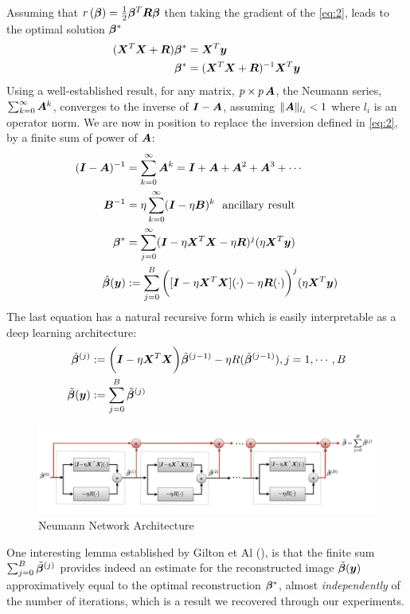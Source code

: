 \documentclass{article}
\begin{document}
Assuming that $r\left( \bm{\beta} \right) = \frac{1}{2} \bm{\beta}^T \bm{R} \bm{\beta}$ then taking the gradient of the \eqref{eq:2}, leads to the optimal solution $\bm{\beta}^{\ast}$
\begin{align*}
	(\bm{X}^T \bm{X} + \bm{R}) \bm{\beta}^* &=	\bm{X}^T \bm{y} \\
	\bm{\beta}^* 			&= (\bm{X}^T \bm{X} + \bm{R})^{-1} \bm{X}^T \bm{y} \\
\end{align*}
Using a well-established  result,  for any matrix, $ p \times p \, \bm{A}$, the Neumann series, $\sum_{k=0}^\infty \bm{A}^k$, converges to the inverse of $\bm{I} - \bm{A}$,
assuming $\|\bm{A}\|_{l_i} < 1$ where $l_i$ is an operator norm. We are now in position to replace the inversion defined in  \eqref{eq:2}, by a finite sum of power of $\bm{A}$:
\begin{align*}
	(\bm{I} - \bm{A})^{-1}	&= \sum_{k=0}^{\infty} \bm{A}^k = \bm{I} + \bm{A} + \bm{A}^2 + \bm{A}^3 + \cdots \\ 
	\bm{B}^{-1}			&= \eta  \sum_{k=0}^{\infty}  (\bm{I} - \eta \bm{B})^k \text{~ ancillary result} \\	
	\bm{\beta}^{\ast}		&=  \sum_{j=0}^{\infty} (\bm{I} - \eta \bm{X}^T \bm{X} -\eta \bm{R})^j (\eta \bm{X}^T \bm{y}) \\
	\hat{\bm{\beta}}(\bm{y})  &:=  \sum_{j=0}^{B} \bigg([ \bm{I} - \eta \bm{X}^T \bm{X} ](\cdot) -\eta \bm{R}(\cdot) \bigg)^j (\eta \bm{X}^T \bm{y}) \\	
\end{align*}
The last equation has a natural recursive form which is easily interpretable as a deep learning architecture:
\begin{align*}
	\tilde{\bm{\beta}}^{(j)} 		&:=	\bigg( \bm{I} - \eta \bm{X}^T \bm{X} \bigg) \tilde{\bm{\beta}}^{(j-1)} - \eta R(\tilde{\bm{\beta}}^{(j-1)}), j=1, \cdots , B \\
	\tilde{\bm{\beta}}(\bm{y})	&:=   \sum_{j=0}^{B} \tilde{\bm{\beta}}^{(j)} \\
\end{align*}
	\begin{figure}[H]
		\centering
		\captionsetup{justification=centering}
		\includegraphics[width=400pt]{nn_architecture}
		\caption{Neumann Network Architecture}
		\label{fig:nn_architecture}
	\end{figure}
One interesting lemma established by Gilton et Al (\cite{DBLP:journals/corr/abs-1901-03707}), is that the finite sum $\sum_{j=0}^{B} \tilde{\bm{\beta}}^{(j)} $ provides indeed an estimate for the reconstructed image $\tilde{\bm{\beta}}(\bm{y})$  approximatively equal to the optimal reconstruction  $\bm{\beta}^{\ast}$, almost \emph{independently} of the number of iterations, which is a result we recovered through our experiments.
\end{document}
